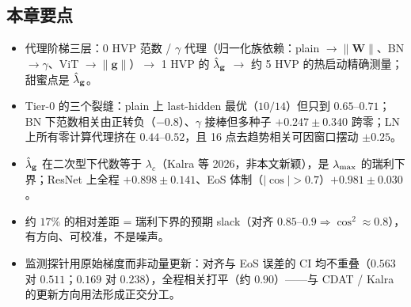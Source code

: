 \subsection*{本章要点}
\begin{itemize}
  \item 代理阶梯三层：0 HVP 范数 / $\gamma$ 代理（归一化族依赖：plain
$\to\|\mathbf{W}\|$、BN $\to\gamma$、ViT $\to\|\mathbf{g}\|$）$\to$ 1 HVP 的
$\hat{\lambda}_{\mathbf{g}}$ $\to$ 约 5 HVP 的热启动精确测量；甜蜜点是 $\hat{\lambda}_{\mathbf{g}}$。
  \item Tier-0 的三个裂缝：plain 上 last-hidden 最优（$10/14$）但只到
$0.65$--$0.71$；BN 下范数相关由正转负（$-0.8$）、$\gamma$ 接棒但多种子
$+0.247\pm0.340$ 跨零；LN 上所有零计算代理挤在 $0.44$--$0.52$，且 16
点去趋势相关可因窗口摆动 $\pm0.25$。
  \item $\hat{\lambda}_{\mathbf{g}}$ 在二次型下代数等于 $\lambda_c$（Kalra 等 2026，非本文新颖），是
$\lambda_{\max}$ 的瑞利下界；ResNet 上全程 $+0.898\pm0.141$、EoS
体制（$|\cos|>0.7$）$+0.981\pm0.030$。
  \item 约 $17\%$ 的相对差距 = 瑞利下界的预期 slack（对齐 $0.85$--$0.9
\Rightarrow \cos^{2}\!\approx\!0.8$），有方向、可校准，不是噪声。
  \item 监测探针用原始梯度而非动量更新：对齐与 EoS 误差的 CI 均不重叠（$0.563$
对 $0.511$；$0.169$ 对 $0.238$），全程相关打平（约 $0.90$）——与 CDAT / Kalra
的更新方向用法形成正交分工。
\end{itemize}
